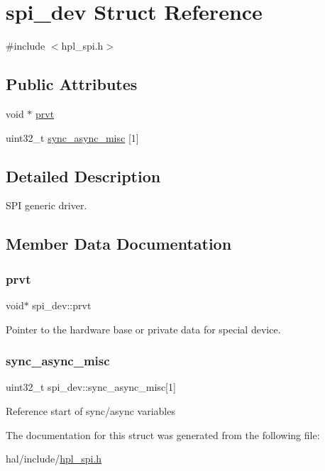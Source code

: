 \hypertarget{structspi__dev}{}\section{spi\+\_\+dev Struct Reference}
\label{structspi__dev}


{\ttfamily \#include $<$hpl\+\_\+spi.\+h$>$}

\subsection*{Public Attributes}
\begin{DoxyCompactItemize}
\item 
void $\ast$ \hyperlink{structspi__dev_a345fa56e5a77f483f1b970899e82a924}{prvt}
\item 
uint32\+\_\+t \hyperlink{structspi__dev_a067e959e7d4f467249b7f955dcd638d2}{sync\+\_\+async\+\_\+misc} \mbox{[}1\mbox{]}
\end{DoxyCompactItemize}


\subsection{Detailed Description}
S\+PI generic driver. 

\subsection{Member Data Documentation}
\mbox{\label{structspi__dev_a345fa56e5a77f483f1b970899e82a924}} 
\subsubsection{\texorpdfstring{prvt}{prvt}}
{\footnotesize\ttfamily void$\ast$ spi\+\_\+dev\+::prvt}

Pointer to the hardware base or private data for special device. \mbox{\label{structspi__dev_a067e959e7d4f467249b7f955dcd638d2}} 
\subsubsection{\texorpdfstring{sync\+\_\+async\+\_\+misc}{sync\_async\_misc}}
{\footnotesize\ttfamily uint32\+\_\+t spi\+\_\+dev\+::sync\+\_\+async\+\_\+misc\mbox{[}1\mbox{]}}

Reference start of sync/async variables 

The documentation for this struct was generated from the following file\+:\begin{DoxyCompactItemize}
\item 
hal/include/\hyperlink{hpl__spi_8h}{hpl\+\_\+spi.\+h}\end{DoxyCompactItemize}
